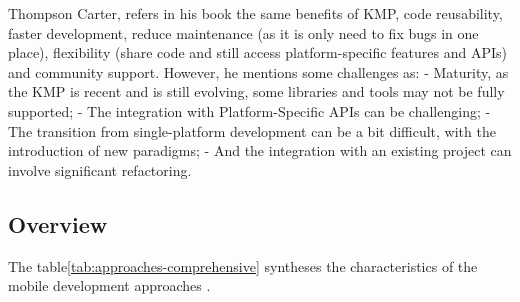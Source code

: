 Thompson Carter, refers in his book\cite{kotlinInDepth} the same benefits of KMP, code reusability, faster development, reduce maintenance (as it is only need to fix bugs in one place), flexibility (share code and still access platform-specific features and APIs) and community support.
However, he mentions some challenges as:
- Maturity, as the KMP is recent and is still evolving, some libraries and tools may not be fully supported;
- The integration with Platform-Specific APIs can be challenging;
- The transition from single-platform development can be a bit difficult, with the introduction of new paradigms;
- And the integration with an existing project can involve significant refactoring.

\subsection{Overview}\label{subsec:overview}

The table\ref{tab:approaches-comprehensive} syntheses the characteristics of the mobile development approaches .


\renewcommand{\arraystretch}{1.2}
\setlength{\tabcolsep}{8pt}

